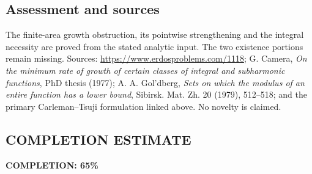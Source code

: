 \subsection*{Assessment and sources}
The finite-area growth obstruction, its pointwise strengthening and the integral necessity are proved from the stated analytic input. The two existence portions remain missing. Sources: \url{https://www.erdosproblems.com/1118}; G. Camera, \emph{On the minimum rate of growth of certain classes of integral and subharmonic functions}, PhD thesis (1977); A. A. Gol'dberg, \emph{Sets on which the modulus of an entire function has a lower bound}, Sibirsk. Mat. Zh. 20 (1979), 512--518; and the primary Carleman--Tsuji formulation linked above. No novelty is claimed.
\subsection*{COMPLETION ESTIMATE}
\textbf{COMPLETION: 65\%}
